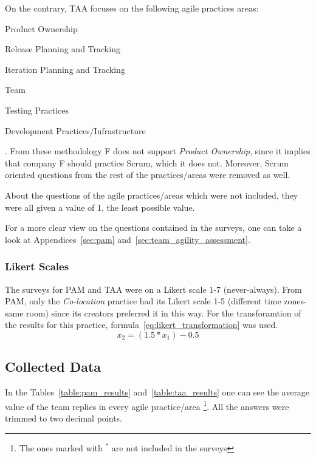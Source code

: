 On the contrary, TAA focuses on the following agile practices areas:
\begin{inparaenum} [a\upshape)]
	\item Product Ownership
	\item Release Planning and Tracking
	\item Iteration Planning and Tracking
	\item Team
	\item Testing Practices
	\item Development Practices/Infrastructure
\end{inparaenum}
. From these methodology F does not support \textit{Product Ownership}, since it implies that company F should practice Scrum, which it does not. Moreover, Scrum oriented questions from the rest of the practices/areas were removed as well. 

About the questions of the agile practices/areas which were not included, they were all given a value of 1, the least possible value. 

For a more clear view on the questions contained in the surveys, one can take a look at Appendices~\ref{sec:pam} and~\ref{sec:team_agility_assessment}.

\subsubsection{Likert Scales}
The surveys for PAM and TAA were on a Likert scale 1-7 (never-always). From PAM,  only the \textit{Co-location} practice had its Likert scale 1-5 (different time zones-same room) since its creators preferred it in this way. For the transforamtion of the results for this practice, formula~\eqref{eq:likert_transformation} \cite{likert_transformation} was used.  \begin{equation} \label{eq:likert_transformation} x_2 = (1.5 * x_1) - 0.5 \end{equation} 


\subsection{Collected Data}

In the Tables~\ref{table:pam_results} and~\ref{table:taa_results} one can see the average value of the team replies in every agile practice/area \footnote{The ones  marked with $^\ast$ are not included in the surveys}. All the answers were trimmed to two decimal points.

